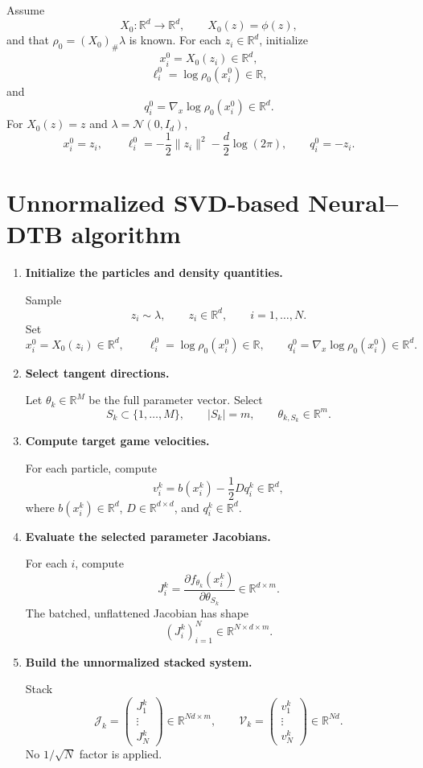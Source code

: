 \documentclass[11pt]{article}
\newcommand{\R}{\mathbb{R}}
\begin{document}
Assume
\[
X_0:\R^d\to\R^d,
\qquad
X_0(z)=\phi(z),
\]
and that $\rho_0=(X_0)_{\#}\lambda$ is known. For each $z_i\in\R^d$, initialize
\[
\boxed{
x_i^0=X_0(z_i)\in\R^d,
}
\]
\[
\boxed{
\ell_i^0=\log\rho_0(x_i^0)\in\R,
}
\]
and
\[
\boxed{
q_i^0=\nabla_x\log\rho_0(x_i^0)\in\R^d.
}
\]
For $X_0(z)=z$ and $\lambda=\mathcal N(0,I_d)$,
\[
x_i^0=z_i,
\qquad
\ell_i^0=-\frac12\|z_i\|^2-\frac d2\log(2\pi),
\qquad
q_i^0=-z_i.
\]

\section{Unnormalized SVD-based Neural--DTB algorithm}

\begin{enumerate}[leftmargin=2.3em,label=\textbf{Step \arabic*.}]
    \item \textbf{Initialize the particles and density quantities.}

    Sample
    \[
    z_i\sim\lambda,
    \qquad
    z_i\in\R^d,
    \qquad
    i=1,\ldots,N.
    \]
    Set
    \[
    x_i^0=X_0(z_i)\in\R^d,
    \qquad
    \ell_i^0=\log\rho_0(x_i^0)\in\R,
    \qquad
    q_i^0=\nabla_x\log\rho_0(x_i^0)\in\R^d.
    \]

    \item \textbf{Select tangent directions.}

    Let $\theta_k\in\R^M$ be the full parameter vector. Select
    \[
    S_k\subset\{1,\ldots,M\},
    \qquad
    |S_k|=m,
    \qquad
    \theta_{k,S_k}\in\R^m.
    \]

    \item \textbf{Compute target game velocities.}

    For each particle, compute
    \[
    v_i^k
    =
    b(x_i^k)-\frac12Dq_i^k
    \in\R^d,
    \]
    where $b(x_i^k)\in\R^d$, $D\in\R^{d\times d}$, and $q_i^k\in\R^d$.

    \item \textbf{Evaluate the selected parameter Jacobians.}

    For each $i$, compute
    \[
    J_i^k
    =
    \frac{\partial f_{\theta_k}(x_i^k)}{\partial\theta_{S_k}}
    \in\R^{d\times m}.
    \]
    The batched, unflattened Jacobian has shape
    \[
    (J_i^k)_{i=1}^N\in\R^{N\times d\times m}.
    \]

    \item \textbf{Build the unnormalized stacked system.}

    Stack
    \[
    \mathcal J_k
    =
    \begin{pmatrix}
    J_1^k\\ \vdots\\ J_N^k
    \end{pmatrix}
    \in\R^{Nd\times m},
    \qquad
    \mathcal V_k
    =
    \begin{pmatrix}
    v_1^k\\ \vdots\\ v_N^k
    \end{pmatrix}
    \in\R^{Nd}.
    \]
    No $1/\sqrt N$ factor is applied.


\end{enumerate}
\end{document}
